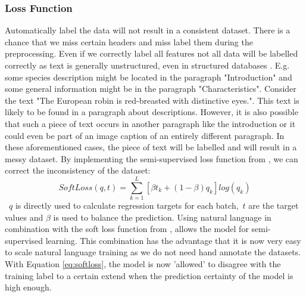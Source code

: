 \documentclass[a4paper, 12pt, oneside]{book} %
\begin{document}

\subsubsection{Loss Function}
Automatically label the data will not result in a consistent dataset.
There is a chance that we miss certain headers and miss label them during the preprocessing.
Even if we correctly label all features not all data will be labelled correctly as text is generally unstructured, even in structured databases \autocite{kumar_text_2020}.
E.g. some species description might be located in the paragraph "Introduction" and some general information might be in the paragraph "Characteristics".
Consider the text "The European robin is red-breasted with distinctive eyes.".
This text is likely to be found in a paragraph about descriptions.
However, it is also possible that such a piece of text occurs in another paragraph like the introduction or it could even be part of an image caption of an entirely different paragraph. 
In these aforementioned cases, the piece of text will be labelled and will result in a messy dataset.
By implementing the semi-supervised loss function from \textcite{reed_training_2015}, we can correct the inconsistency of the dataset:
\begin{equation} \label{eq:softloss}
 SoftLoss(q, t) = \sum_{k=1}^{L}[\beta t _k + (1- \beta )q _k]log(q _k)
\end{equation}
~$q$ is directly used to calculate regression targets for each batch,~$t$ are the target values and \(\beta\) is used to balance the prediction.
Using natural language in combination with the soft loss function from \textcite{reed_training_2015}, allows the model for semi-supervised learning.
This combination has the advantage that it is now very easy to scale natural language training as we do not need hand annotate the datasets.
With Equation \ref{eq:softloss}, the model is now 'allowed' to disagree with the training label to a certain extend when the prediction certainty of the model is high enough.
\end{document}
